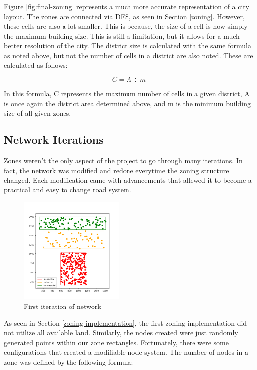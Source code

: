 \documentclass[11pt]{article}
\begin{document}
\begin{multicols}{2}
    \quad Figure \ref{fig:final-zoning} represents a much more accurate representation of a city layout. The zones are connected via DFS, as seen in Section \ref{zoning}. However, these cells are also a lot smaller. This is because, the size of a cell is now simply the maximum building size. This is still a limitation, but it allows for a much better resolution of the city. The district size is calculated with the same formula as noted above, but not the number of cells in a district are also noted. These are calculated as follows:

    \[C = A \div m\]

    In this formula, C represents the maximum number of cells in a given district, A is once again the district area determined above, and m is the minimum building size of all given zones.

    \subsection{Network Iterations}

    \quad Zones weren't the only aspect of the project to go through many iterations. In fact, the network was modified and redone everytime the zoning structure changed. Each modification came with advancements that allowed it to become a practical and easy to change road system.

    \begin{figure}[H]
        \centering
        \vspace{-1em}
        \includegraphics[width=0.45\textwidth]{images/firstzoningwnodes.png}
        \caption{First iteration of network}
        \label{fig:first-network}
    \end{figure}

    \quad As seen in Section \ref{zoning-implementation}, the first zoning implementation did not utilize all available land. Similarly, the nodes created were just randomly generated points within our zone rectangles. Fortunately, there were some configurations that created a modifiable node system. The number of nodes in a zone was defined by the following formula:


\end{multicols}
\end{document}
